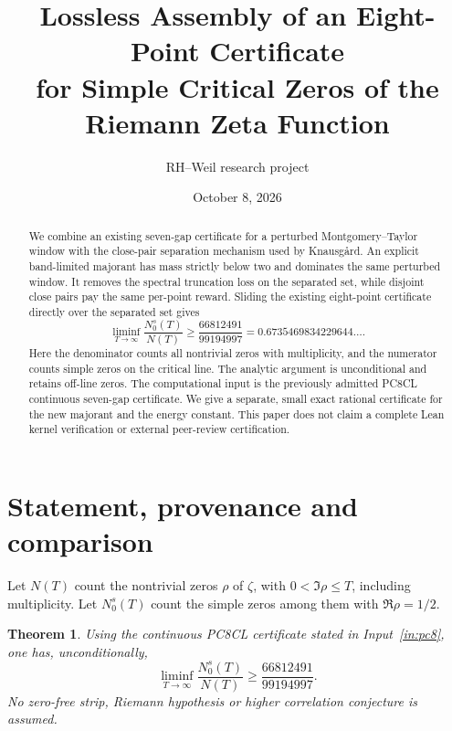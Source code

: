 \documentclass[11pt,a4paper]{article}
\title{Lossless Assembly of an Eight-Point Certificate\\
for Simple Critical Zeros of the Riemann Zeta Function}
\author{RH--Weil research project}
\date{October 8, 2026}
\newtheorem{theorem}{Theorem}[section]
\theoremstyle{remark}
\begin{document}
\maketitle
\begin{abstract}
We combine an existing seven-gap certificate for a perturbed
Montgomery--Taylor window with the close-pair separation mechanism used
by Knausg{\aa}rd. An explicit band-limited majorant has mass strictly
below two and dominates the same perturbed window. It removes the
spectral truncation loss on the separated set, while disjoint close pairs
pay the same per-point reward. Sliding the existing eight-point
certificate directly over the separated set gives
\[
 \liminf_{T\to\infty}\frac{N_0^s(T)}{N(T)}
 \ge \frac{66812491}{99194997}
 =0.6735469834229644\ldots .
\]
Here the denominator counts all nontrivial zeros with multiplicity,
and the numerator counts simple zeros on the critical line.
The analytic argument is unconditional and retains off-line zeros.
The computational input is the previously admitted PC8CL continuous
seven-gap certificate. We give a separate, small exact rational
certificate for the new majorant and the energy constant. This paper
does not claim a complete Lean kernel verification or external
peer-review certification.
\end{abstract}

\section{Statement, provenance and comparison}

Let $N(T)$ count the nontrivial zeros $\rho$ of $\zeta$, with
$0<\Im\rho\le T$, including multiplicity. Let $N_0^s(T)$ count the
simple zeros among them with $\Re\rho=1/2$.

\begin{theorem}\label{thm:main}
Using the continuous PC8CL certificate stated in
Input~\ref{in:pc8}, one has, unconditionally,
\begin{equation}\label{eq:main}
 \liminf_{T\to\infty}\frac{N_0^s(T)}{N(T)}
 \ge \frac{66812491}{99194997}.
\end{equation}
No zero-free strip, Riemann hypothesis or higher correlation
conjecture is assumed.
\end{theorem}
\end{document}
